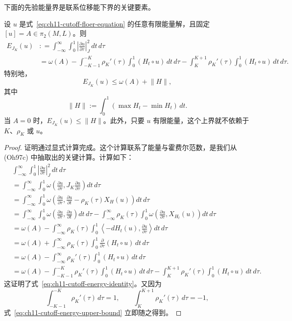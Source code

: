 下面的先验能量界是联系位移能下界的关键要素。

\begin{lemma}\label{lem:ch11-cutoff-energy-bound}
设 $u$ 是式~\eqref{eq:ch11-cutoff-floer-equation} 的任意有限能量解，且固定
$[u]=A\in\pi_2(M,L)$。则
\begin{equation}
 \begin{aligned}
 E_{J_K}(u)
 &: =\int_{-\infty}^{\infty}\int_0^1
 \left|\frac{\partial u}{\partial\tau}\right|_J^2\,dt\,d\tau\\
 &=\omega(A)
 -\int_{-K-1}^{-K}\rho_K'(\tau)
      \int_0^1(H_t\circ u)\,dt\,d\tau
 -\int_K^{K+1}\rho_K'(\tau)
      \int_0^1(H_t\circ u)\,dt\,d\tau.
 \end{aligned}
 \label{eq:ch11-cutoff-energy-identity}
\end{equation}
特别地，
\begin{equation}
 E_{J_K}(u)\leq\omega(A)+\lVert H\rVert,
 \label{eq:ch11-cutoff-energy-upper-bound}
\end{equation}
其中
\[
 \lVert H\rVert:=\int_0^1(\max H_t-\min H_t)\,dt.
\]
当 $A=0$ 时，$E_{J_K}(u)\leq\lVert H\rVert$。此外，只要 $u$ 有限能量，这个上界就不依赖于 $K$、$\rho_K$ 或 $u$。
\end{lemma}

\begin{proof}
证明通过显式计算完成。这个计算联系了能量与霍费尔范数，是我们从 (Oh97c) 中抽取出的关键计算。计算如下：
\[
 \begin{aligned}
 &\int_{-\infty}^{\infty}\int_0^1
 \left|\frac{\partial u}{\partial\tau}\right|_J^2\,dt\,d\tau\\
 &=\int_{-\infty}^{\infty}\int_0^1
 \omega\left(\frac{\partial u}{\partial\tau},
 J_K\frac{\partial u}{\partial\tau}\right)dt\,d\tau\\
 &=\int_{-\infty}^{\infty}\int_0^1
 \omega\left(\frac{\partial u}{\partial\tau},
 \frac{\partial u}{\partial t}-\rho_K(\tau)X_H(u)\right)dt\,d\tau\\
 &=\int_{-\infty}^{\infty}\int_0^1
 \omega\left(\frac{\partial u}{\partial\tau},
 \frac{\partial u}{\partial t}\right)dt\,d\tau
 -\int_{-\infty}^{\infty}\rho_K(\tau)\int_0^1
 \omega\left(\frac{\partial u}{\partial\tau},X_{H_t}(u)\right)dt\,d\tau\\
 &=\omega(A)-\int_{-\infty}^{\infty}\rho_K(\tau)\int_0^1
 \left\langle-dH_t(u),\frac{\partial u}{\partial\tau}\right\rangle dt\,d\tau\\
 &=\omega(A)+\int_{-\infty}^{\infty}\rho_K(\tau)\int_0^1
 \frac{\partial}{\partial\tau}(H_t\circ u)\,dt\,d\tau\\
 &=\omega(A)-\int_{-\infty}^{\infty}\rho_K'(\tau)
 \int_0^1(H_t\circ u)\,dt\,d\tau\\
 &=\omega(A)-\int_{-K-1}^{-K}\rho_K'(\tau)
 \int_0^1(H_t\circ u)\,dt\,d\tau
 -\int_K^{K+1}\rho_K'(\tau)
 \int_0^1(H_t\circ u)\,dt\,d\tau.
 \end{aligned}
\]
这证明了式~\eqref{eq:ch11-cutoff-energy-identity}。又因为
\[
 \int_{-K-1}^{-K}\rho_K'(\tau)\,d\tau=1,
 \qquad
 \int_K^{K+1}\rho_K'(\tau)\,d\tau=-1,
\]
式~\eqref{eq:ch11-cutoff-energy-upper-bound} 立即随之得到。
\end{proof}

